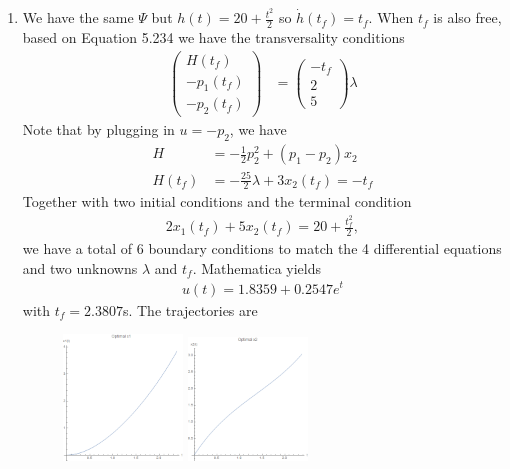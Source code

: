 \documentclass[12pt]{article}
\begin{document}
\begin{problem}[1]
\begin{enumerate}[label=(\alph*)]
\item We have the same $\Psi $ but $ h(t) = 20 +\frac{t^2}{ 2}$ so $ \dot{h}(t_f) = t_f$. When $ t_f$ is also free, based on Equation 5.234 we have the transversality conditions
\begin{align*}
	\begin{pmatrix} H(t_f)\\ -p_1(t_f)\\-p_2(t_f) \end{pmatrix} &= \begin{pmatrix} -t_f\\ 2\\5 \end{pmatrix} \lambda 
\end{align*}
Note that by plugging in $ u=-p_2$, we have
\begin{align*}
	H &= -\frac{1}{2} p_2^2+(p_1-p_2)x_2\\
	H(t_f)&= -\frac{25}{2} \lambda + 3x_2(t_f) = -t_f 
\end{align*}
Together with two initial conditions and the terminal condition
\begin{align*}
	2x_1(t_f) +5x_2(t_f) = 20 + \frac{t_f^2}{ 2},
\end{align*}
we have a total of 6 boundary conditions to match the 4 differential equations and two unknowns $ \lambda$ and $ t_f$. Mathematica yields
\begin{align*}
	u(t) = 1.8359 + 0.2547 e^{t} 
\end{align*}
with $ t_f = 2.3807$s.
The trajectories are
~\begin{figure}[H]
	\centering
	\includegraphics[width=0.3\textwidth]{./figures/4.15.png}
	\includegraphics[width=0.3\textwidth]{./figures/4.16.png}

\end{figure}
\end{enumerate}
\end{problem}
\end{document}
